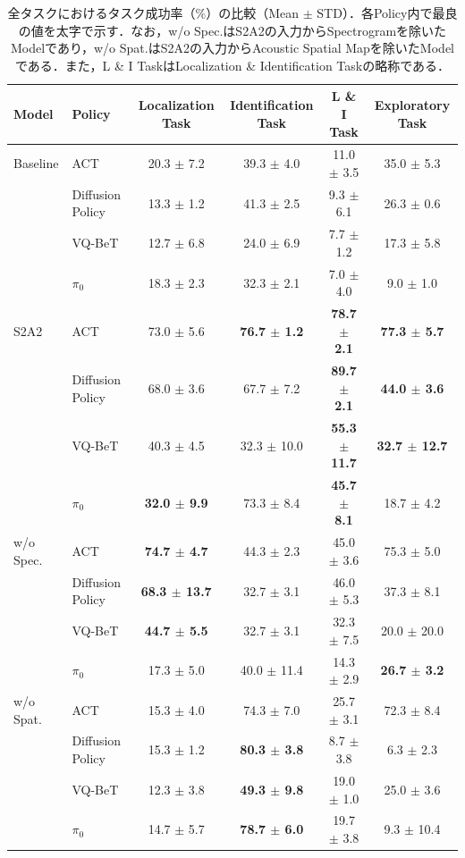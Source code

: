 \documentclass{article}
\begin{document}
	\begin{table}[t]
		\centering
		\scriptsize
		\setlength{\tabcolsep}{4pt}
		\caption{全タスクにおけるタスク成功率（\%）の比較（Mean $\pm$ STD）．各Policy内で最良の値を太字で示す．なお，w/o Spec.はS2A2の入力からSpectrogramを除いたModelであり，w/o Spat.はS2A2の入力からAcoustic Spatial Mapを除いたModelである．また，L \& I TaskはLocalization \& Identification Taskの略称である．}
		\label{tab:results}
		\begin{tabular}{llcccc}
			\hline
			Model & Policy & Localization Task & Identification Task & L \& I Task & Exploratory Task \\
			\hline
			Baseline & ACT & 20.3 $\pm$ 7.2 & 39.3 $\pm$ 4.0 & 11.0 $\pm$ 3.5 & 35.0 $\pm$ 5.3 \\
			 & Diffusion Policy & 13.3 $\pm$ 1.2 & 41.3 $\pm$ 2.5 & 9.3 $\pm$ 6.1 & 26.3 $\pm$ 0.6 \\
			 & VQ-BeT & 12.7 $\pm$ 6.8 & 24.0 $\pm$ 6.9 & 7.7 $\pm$ 1.2 & 17.3 $\pm$ 5.8 \\
			 & $\pi_0$ & 18.3 $\pm$ 2.3 & 32.3 $\pm$ 2.1 & 7.0 $\pm$ 4.0 & 9.0 $\pm$ 1.0 \\
			\hline
			S2A2 & ACT & 73.0 $\pm$ 5.6 & \textbf{76.7 $\pm$ 1.2} & \textbf{78.7 $\pm$ 2.1} & \textbf{77.3 $\pm$ 5.7} \\
			 & Diffusion Policy & 68.0 $\pm$ 3.6 & 67.7 $\pm$ 7.2 & \textbf{89.7 $\pm$ 2.1} & \textbf{44.0 $\pm$ 3.6} \\
			 & VQ-BeT & 40.3 $\pm$ 4.5 & 32.3 $\pm$ 10.0 & \textbf{55.3 $\pm$ 11.7} & \textbf{32.7 $\pm$ 12.7} \\
			 & $\pi_0$ & \textbf{32.0 $\pm$ 9.9} & 73.3 $\pm$ 8.4 & \textbf{45.7 $\pm$ 8.1} & 18.7 $\pm$ 4.2 \\
			\hline
			w/o Spec. & ACT & \textbf{74.7 $\pm$ 4.7} & 44.3 $\pm$ 2.3 & 45.0 $\pm$ 3.6 & 75.3 $\pm$ 5.0 \\
			 & Diffusion Policy & \textbf{68.3 $\pm$ 13.7} & 32.7 $\pm$ 3.1 & 46.0 $\pm$ 5.3 & 37.3 $\pm$ 8.1 \\
			 & VQ-BeT & \textbf{44.7 $\pm$ 5.5} & 32.7 $\pm$ 3.1 & 32.3 $\pm$ 7.5 & 20.0 $\pm$ 20.0 \\
			 & $\pi_0$ & 17.3 $\pm$ 5.0 & 40.0 $\pm$ 11.4 & 14.3 $\pm$ 2.9 & \textbf{26.7 $\pm$ 3.2} \\
			\hline
			w/o Spat. & ACT & 15.3 $\pm$ 4.0 & 74.3 $\pm$ 7.0 & 25.7 $\pm$ 3.1 & 72.3 $\pm$ 8.4 \\
			 & Diffusion Policy & 15.3 $\pm$ 1.2 & \textbf{80.3 $\pm$ 3.8} & 8.7 $\pm$ 3.8 & 6.3 $\pm$ 2.3 \\
			 & VQ-BeT & 12.3 $\pm$ 3.8 & \textbf{49.3 $\pm$ 9.8} & 19.0 $\pm$ 1.0 & 25.0 $\pm$ 3.6 \\
			 & $\pi_0$ & 14.7 $\pm$ 5.7 & \textbf{78.7 $\pm$ 6.0} & 19.7 $\pm$ 3.8 & 9.3 $\pm$ 10.4 \\
			\hline
		\end{tabular}
	\end{table}
\end{document}
